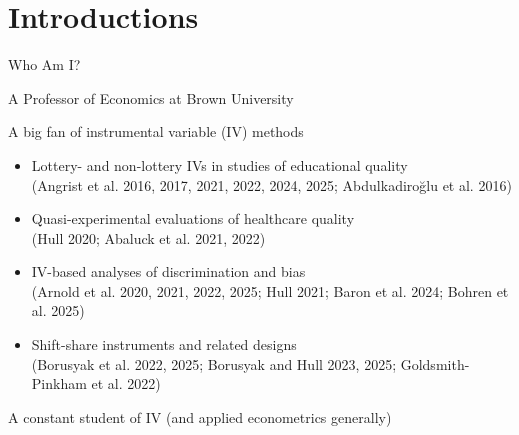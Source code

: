 \documentclass{beamer}
\begin{document}
 
\section{Introductions}

\begin{frame}{Who Am I?}
{\small
A Professor of Economics at Brown University\pause

A big fan of instrumental variable (IV) methods\pause
\begin{itemize}
  \item Lottery- and non-lottery IVs in studies of educational quality \\ {\scriptsize \textcolor{red!75!green!50!blue!25!gray}{(Angrist et al. 2016, 2017, 2021, 2022, 2024, 2025; Abdulkadiro\u{g}lu et al. 2016)}}
  \item Quasi-experimental evaluations of healthcare quality \\ {\scriptsize \textcolor{red!75!green!50!blue!25!gray}{(Hull 2020; Abaluck et al. 2021, 2022)}}
  \item IV-based analyses of discrimination and bias \\ {\scriptsize \textcolor{red!75!green!50!blue!25!gray}{(Arnold et al. 2020, 2021, 2022, 2025; Hull 2021; Baron et al. 2024; Bohren et al. 2025)}}
  \item Shift-share instruments and related designs \\ {\scriptsize \textcolor{red!75!green!50!blue!25!gray}{(Borusyak et al. 2022, 2025; Borusyak and Hull 2023, 2025; Goldsmith-Pinkham et al. 2022)}}
\end{itemize}\pause

A constant student of IV (and applied econometrics generally)
}
\end{frame}
\end{document}
